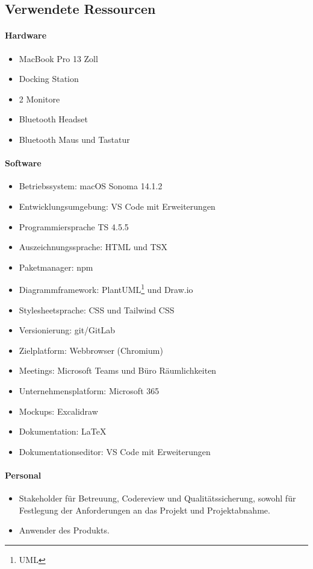 \subsection{Verwendete Ressourcen}
\label{app:VerwendeteRessourcen}

\paragraph{Hardware}
\begin{itemize}
	\item MacBook Pro 13 Zoll
	\item Docking Station
	\item 2 Monitore
	\item Bluetooth Headset
	\item Bluetooth Maus und Tastatur
\end{itemize}

\paragraph{Software}
\begin{itemize}
	\item Betriebssystem: macOS Sonoma 14.1.2
	\item Entwicklungsumgebung: \ac{VS} Code mit Erweiterungen
	\item Programmiersprache \ac{TS} 4.5.5
	\item Auszeichnungssprache: \ac{HTML} und \ac{TSX}
	\item Paketmanager: npm
	\item Diagrammframework: PlantUML\footnote{\ac{UML}} und Draw.io
	\item Stylesheetsprache: \ac{CSS} und Tailwind \ac{CSS}
	\item Versionierung: git/GitLab
	\item Zielplatform: Webbrowser (Chromium)
	\item Meetings: Microsoft Teams und Büro Räumlichkeiten
	\item Unternehmensplatform: Microsoft 365
	\item Mockups: Excalidraw
	\item Dokumentation: LaTeX
	\item Dokumentationseditor: \ac{VS} Code mit Erweiterungen
\end{itemize}

\paragraph{Personal}
\begin{itemize}
	\item Stakeholder für Betreuung, Codereview und Qualitätssicherung, sowohl für Festlegung der Anforderungen an das Projekt und Projektabnahme.
	\item Anwender des Produkts.
\end{itemize}